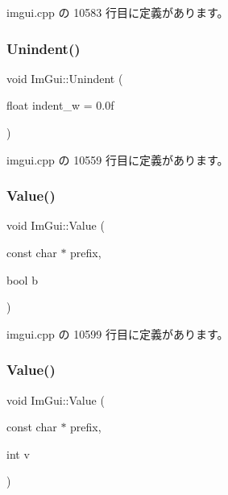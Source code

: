 imgui.\+cpp の 10583 行目に定義があります。

\mbox{\label{namespace_im_gui_ad577d36753634c9bbdc3750b0e5217f5}} 
\subsubsection{\texorpdfstring{Unindent()}{Unindent()}}
{\footnotesize\ttfamily void Im\+Gui\+::\+Unindent (\begin{DoxyParamCaption}\item[{float}]{indent\+\_\+w = {\ttfamily 0.0f} }\end{DoxyParamCaption})}



 imgui.\+cpp の 10559 行目に定義があります。

\mbox{\label{namespace_im_gui_a1b3324308e43eeded5c3599fa0f03e85}} 
\subsubsection{\texorpdfstring{Value()}{Value()}\hspace{0.1cm}{\footnotesize\ttfamily [1/4]}}
{\footnotesize\ttfamily void Im\+Gui\+::\+Value (\begin{DoxyParamCaption}\item[{const char $\ast$}]{prefix,  }\item[{bool}]{b }\end{DoxyParamCaption})}



 imgui.\+cpp の 10599 行目に定義があります。

\mbox{\label{namespace_im_gui_a654ceb70f2dd1598f88861f54764ee08}} 
\subsubsection{\texorpdfstring{Value()}{Value()}\hspace{0.1cm}{\footnotesize\ttfamily [2/4]}}
{\footnotesize\ttfamily void Im\+Gui\+::\+Value (\begin{DoxyParamCaption}\item[{const char $\ast$}]{prefix,  }\item[{int}]{v }\end{DoxyParamCaption})}



